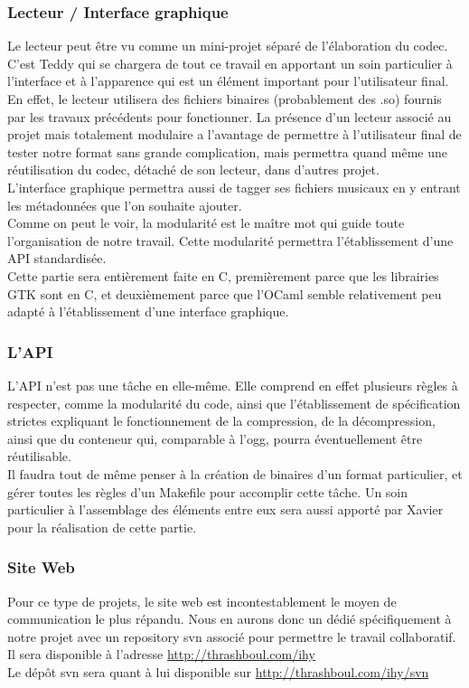 		\subsubsection{Lecteur / Interface graphique}
Le lecteur peut être vu comme  un mini-projet séparé de l'élaboration du
codec.  C'est Teddy qui  se chargera de tout ce  travail en apportant un
soin particulier à  l'interface  et  à  l'apparence  qui  est un élément
important pour l'utilisateur final.  En effet,  le lecteur utilisera des
fichiers  binaires  (probablement  des  .so)  fournis  par  les  travaux
précédents pour fonctionner.  La présence d'un lecteur associé au projet
mais totalement  modulaire  a  l'avantage  de  permettre à l'utilisateur
final de  tester notre format sans  grande complication,  mais permettra
quand même  une réutilisation du  codec,  détaché de  son lecteur,  dans
d'autres projet.\\
L'interface graphique permettra aussi de tagger ses fichiers musicaux en
y entrant les métadonnées que l'on  souhaite ajouter.\\ Comme on peut le
voir,  la modularité est le maître mot qui guide toute l'organisation de
notre  travail.  Cette modularité  permettra  l'établissement  d'une API
standardisée.\\
Cette partie  sera entièrement faite  en C,  premièrement parce  que les
librairies GTK sont  en  C,  et  deuxièmement  parce  que l'OCaml semble
relativement peu adapté à l'établissement d'une interface graphique.

		\subsubsection{L'API}
L'API  n'est  pas  une  tâche  en  elle-même.  Elle  comprend  en  effet
plusieurs règles  à respecter,  comme la modularité  du code,  ainsi que
l'établissement de  spécification strictes expliquant  le fonctionnement
de la  compression,  de la décompression,  ainsi  que du  conteneur qui,
comparable à l'ogg, pourra éventuellement être réutilisable.\\
Il faudra  tout de  même penser à  la création  de binaires  d'un format
particulier,  et gérer  toutes les règles  d'un Makefile  pour accomplir
cette tâche.  Un soin particulier à  l'assemblage des éléments entre eux
sera aussi apporté par Xavier pour la réalisation de cette partie.

		\subsubsection{Site Web}
Pour ce type de projets,  le site  web est incontestablement le moyen de
communication  le   plus  répandu.   Nous  en   aurons  donc   un  dédié
spécifiquement  à  notre projet  avec  un  repository  svn  associé pour
permettre le travail collaboratif.\\
Il sera disponible à l'adresse \url{http://thrashboul.com/ihy}\\
Le    d\'ep\^ot    svn   sera    quant    \`a    lui    disponible   sur
\url{http://thrashboul.com/ihy/svn}

